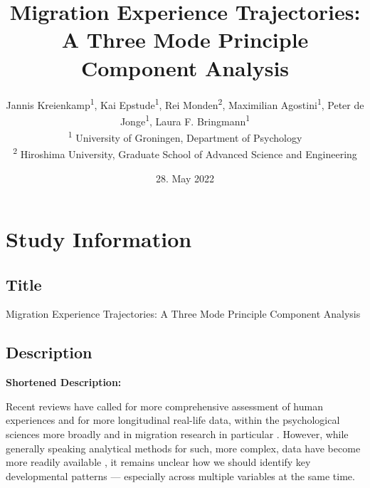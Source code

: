 \documentclass[]{article}
\title{Migration Experience Trajectories: A Three Mode Principle
Component Analysis}
\author{
          Jannis Kreienkamp\textsuperscript{1},
          Kai Epstude\textsuperscript{1},
          Rei Monden\textsuperscript{2},
          Maximilian Agostini\textsuperscript{1},
          Peter de Jonge\textsuperscript{1},
          Laura F.
Bringmann\textsuperscript{1}          \\ \vspace{0.5cm}
              \textsuperscript{1} University of Groningen, Department of
Psychology\\
              \textsuperscript{2} Hiroshima University, Graduate School
of Advanced Science and Engineering      }
\date{28. May 2022}
\newcounter{question}
\begin{document}
\maketitle
\vspace{2pc}


\newcommand\Question[2]{%
   \leavevmode\par
   \stepcounter{question}
   \noindent
   \textbf{\thequestion. #1}. #2\par}

\newcommand\Answer[1]{%
    \noindent
    \textit{Registered response}: #1\par}

\newlength{\mylength}
\setlength{\fboxsep}{15pt}
\setlength{\mylength}{\linewidth}
\addtolength{\mylength}{-2\fboxsep}
\addtolength{\mylength}{-2\fboxrule}

\hypertarget{study-information}{%
\section{Study Information}\label{study-information}}

\hypertarget{title}{%
\subsection{Title}\label{title}}

Migration Experience Trajectories: A Three Mode Principle Component
Analysis

\hypertarget{description}{%
\subsection{Description}\label{description}}

\textbf{Shortened Description:}

Recent reviews have called for more comprehensive assessment of human
experiences and for more longitudinal real-life data, within the
psychological sciences more broadly and in migration research in
particular
\citep[e.g.,][]{Kreienkamp2022d, MacInnis2015, McKeown2017, Pettigrew2011, Ward2019}.
However, while generally speaking analytical methods for such, more
complex, data have become more readily available
\citep[e.g.,][]{ODonnell2021}, it remains unclear how we should identify
key developmental patterns --- especially across multiple variables at
the same time.
\end{document}
